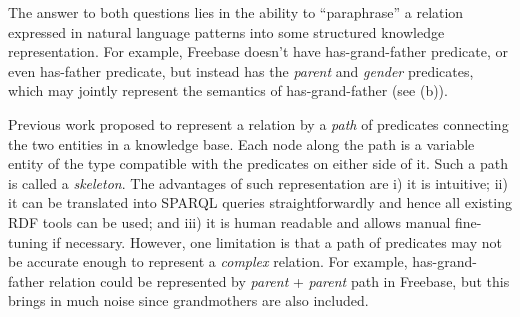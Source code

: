 The answer to both questions lies in the ability to ``paraphrase''
a relation expressed in natural language patterns into some structured
knowledge representation.
For example, Freebase doesn't have has-grand-father predicate,
or even has-father predicate, but instead has the {\em parent}
and {\em gender} predicates, which may jointly represent the semantics
of has-grand-father (see (b)).

Previous work \cite{gardner2015efficient,lao2011random,zou2014natural,zhang2012ontological}
proposed to represent a relation by a {\em path} of
predicates connecting the two entities in a knowledge base.
Each node along the path is a variable entity of the type compatible
with the predicates on either side of it. Such a path is
called a {\em skeleton}.
The advantages of such representation are
i) it is intuitive; ii) it can be translated into
SPARQL queries straightforwardly and hence all existing RDF tools
can be used; and iii) it is human readable and allows manual fine-tuning
if necessary.
However, one limitation is that a path of predicates may not
be accurate enough to represent a {\em complex} relation.
For example, has-grand-father relation could
be represented by {\em parent} + {\em parent} path in Freebase,
but this brings in much noise since grandmothers are also included.


